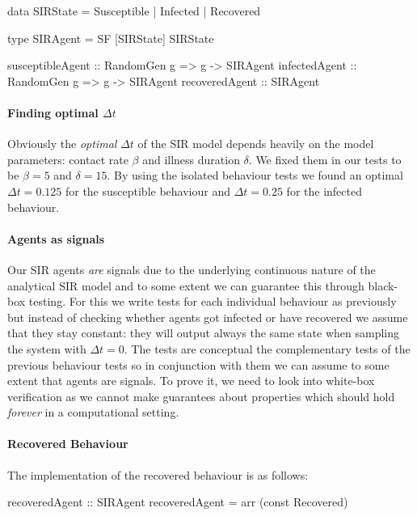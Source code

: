 \begin{HaskellCode}
data SIRState 
  = Susceptible 
  | Infected 
  | Recovered
  
type SIRAgent = SF [SIRState] SIRState

susceptibleAgent :: RandomGen g => g -> SIRAgent
infectedAgent :: RandomGen g => g -> SIRAgent
recoveredAgent :: SIRAgent
\end{HaskellCode}

\paragraph{Finding optimal $\Delta t$}
Obviously the \textit{optimal} $\Delta t$ of the SIR model depends heavily on the model parameters: contact rate $\beta$ and illness duration $\delta$. We fixed them in our tests to be $\beta = 5$ and $\delta = 15$. By using the isolated behaviour tests we found an optimal $\Delta t = 0.125$ for the susceptible behaviour and $\Delta t = 0.25$ for the infected behaviour. %

\paragraph{Agents as signals}
Our SIR agents \textit{are} signals due to the underlying continuous nature of the analytical SIR model and to some extent we can guarantee this through black-box testing. For this we write tests for each individual behaviour as previously but instead of checking whether agents got infected or have recovered we assume that they stay constant: they will output always the same state when sampling the system with $\Delta t = 0$. The tests are conceptual the complementary tests of the previous behaviour tests so in conjunction with them we can assume to some extent that agents are signals. To prove it, we need to look into white-box verification as we cannot make guarantees about properties which should hold \textit{forever} in a computational setting.

\paragraph{Recovered Behaviour}
The implementation of the recovered behaviour is as follows:

\begin{HaskellCode}
recoveredAgent :: SIRAgent
recoveredAgent = arr (const Recovered)
\end{HaskellCode}


